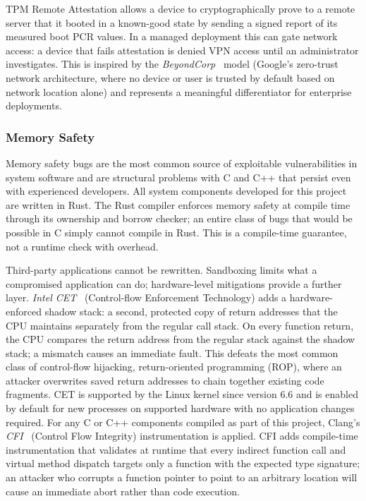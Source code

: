 TPM Remote Attestation allows a device to cryptographically prove to a remote
server that it booted in a known-good state by sending a signed report of its
measured boot PCR values. In a managed deployment this can gate network access:
a device that fails attestation is denied VPN access until an administrator
investigates. This is inspired by the \emph{BeyondCorp}~\cite{beyondcorp} model
(Google's zero-trust network architecture, where no device or user is trusted
by default based on network location alone) and represents a meaningful
differentiator for enterprise deployments.

\subsubsection{Memory Safety}
\label{sec:memory-safety}

Memory safety bugs are the most common source of exploitable vulnerabilities
in system software and are structural problems with C and C++ that persist even
with experienced developers. All system components developed for this project
are written in Rust. The Rust compiler enforces memory safety at compile time
through its ownership and borrow checker; an entire class of bugs that would
be possible in C simply cannot compile in Rust. This is a compile-time
guarantee, not a runtime check with overhead.

Third-party applications cannot be rewritten. Sandboxing limits what a
compromised application can do; hardware-level mitigations provide a further
layer. \emph{Intel CET}~\cite{intel:cet} (Control-flow Enforcement Technology)
adds a hardware-enforced shadow stack: a second, protected copy of return
addresses that the CPU maintains separately from the regular call stack. On
every function return, the CPU compares the return address from the regular
stack against the shadow stack; a mismatch causes an immediate fault. This
defeats the most common class of control-flow hijacking, return-oriented
programming (ROP), where an attacker overwrites saved return addresses to chain
together existing code fragments. CET is supported by the Linux kernel since
version 6.6 and is enabled by default for new processes on supported hardware
with no application changes required. For any C or C++ components compiled as part of this project,
Clang's \emph{CFI}~\cite{clang:cfi} (Control Flow Integrity) instrumentation
is applied. CFI adds compile-time instrumentation that validates at runtime
that every indirect function call and virtual method dispatch targets only a
function with the expected type signature; an attacker who corrupts a function
pointer to point to an arbitrary location will cause an immediate abort rather
than code execution.

